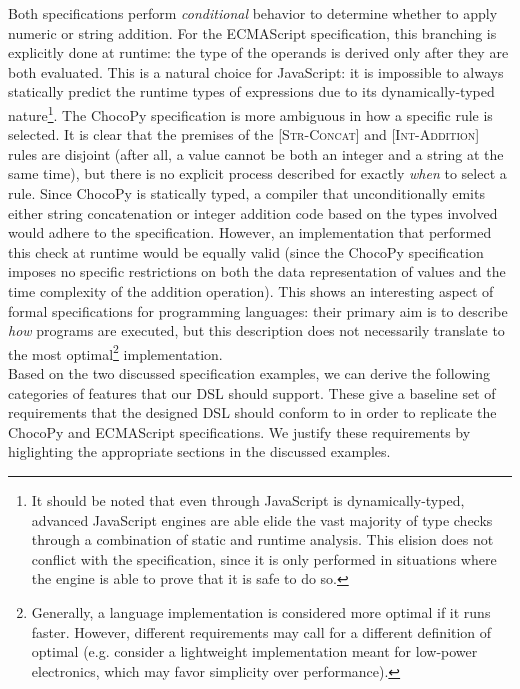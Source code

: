 Both specifications perform \textit{conditional} behavior to determine whether to apply numeric or string addition. For the ECMAScript specification, this branching is explicitly done at runtime: the type of the operands is derived only after they are both evaluated. This is a natural choice for JavaScript: it is impossible to always statically predict the runtime types of expressions due to its dynamically-typed nature\footnote{It should be noted that even through JavaScript is dynamically-typed, advanced JavaScript engines are able elide the vast majority of type checks through a combination of static and runtime analysis. This elision does not conflict with the specification, since it is only performed in situations where the engine is able to prove that it is safe to do so.}. The ChocoPy specification is more ambiguous in how a specific rule is selected. It is clear that the premises of the \textsc{[Str-Concat]} and \textsc{[Int-Addition]} rules are disjoint (after all, a value cannot be both an integer and a string at the same time), but there is no explicit process described for exactly \textit{when} to select a rule. Since ChocoPy is statically typed, a compiler that unconditionally emits either string concatenation or integer addition code based on the types involved would adhere to the specification. However, an implementation that performed this check at runtime would be equally valid (since the ChocoPy specification imposes no specific restrictions on both the data representation of values and the time complexity of the addition operation). This shows an interesting aspect of formal specifications for programming languages: their primary aim is to describe \textit{how} programs are executed, but this description does not necessarily translate to the most optimal\footnote{Generally, a language implementation is considered more optimal if it runs faster. However, different requirements may call for a different definition of optimal (e.g. consider a lightweight implementation meant for low-power electronics, which may favor simplicity over performance).} implementation.\\

Based on the two discussed specification examples, we can derive the following categories of features that our \ac{DSL} should support. These give a baseline set of requirements that the designed \ac{DSL} should conform to in order to replicate the ChocoPy and ECMAScript specifications. We justify these requirements by higlighting the appropriate sections in the discussed examples.

